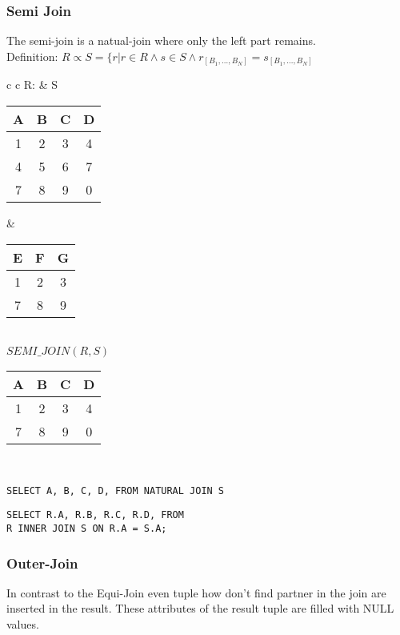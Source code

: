 \subsubsection{Semi Join}
The semi-join is a natual-join where only the left part remains.\\
Definition: $R \propto S = \{r | r \in R \land s \in S
\land r_{[B_1, \dots, B_N]} = s_{[B_1, \dots, B_N]}$

\hspace{-0.5cm}
\begin{tabular}{ c c}
	R: & S \\
	\begin{tabular}{|c|c|c|c|}
		\hline
		A & B & C & D\\
		\hline
		1 & 2 & 3 & 4\\
		\hline
		4 & 5 & 6 & 7\\
		\hline
		7 & 8 & 9 & 0\\
		\hline
	\end{tabular} &

	\begin{tabular}{|c|c|c|}
		\hline
		E & F & G \\
		\hline
		1 & 2 & 3\\
		\hline
		7 & 8 & 9\\
		\hline
	\end{tabular}
\end{tabular}\\

$SEMI\_JOIN(R,S)$\\
\begin{tabular}{|c|c|c|c|}
	\hline
	A & B & C & D\\
	\hline
	1 & 2 & 3 & 4\\
	\hline
	7 & 8 & 9 & 0\\
	\hline
\end{tabular}\\

\lstset{language=SQL,tabsize=4,captionpos=b,frame=single,
basicstyle=\footnotesize}
\begin{lstlisting}[caption=SQL Semi-Join]
SELECT A, B, C, D, FROM NATURAL JOIN S
\end{lstlisting}
\begin{lstlisting}[caption=SQL Semi-Join]
SELECT R.A, R.B, R.C, R.D, FROM 
R INNER JOIN S ON R.A = S.A;
\end{lstlisting}

\subsubsection{Outer-Join}
In contrast to the Equi-Join even tuple how don't find partner in the join are
inserted in the result. These attributes of the result tuple are filled with
NULL values.

